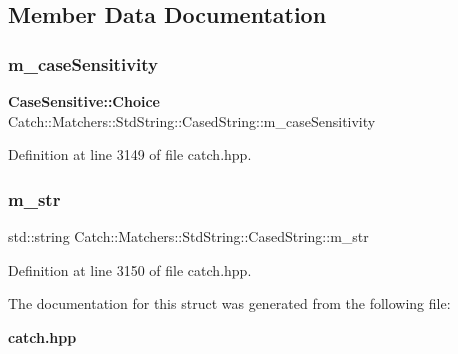 \subsection{Member Data Documentation}
\mbox{\label{struct_catch_1_1_matchers_1_1_std_string_1_1_cased_string_ae1c2864c986941536a6e94cca0528f92}} 
\subsubsection{m\_caseSensitivity}
{\footnotesize\ttfamily \textbf{ Case\+Sensitive\+::\+Choice} Catch\+::\+Matchers\+::\+Std\+String\+::\+Cased\+String\+::m\+\_\+case\+Sensitivity}



Definition at line 3149 of file catch.\+hpp.

\mbox{\label{struct_catch_1_1_matchers_1_1_std_string_1_1_cased_string_ad05dbc99aba3c3c386d6b856b213f911}} 
\subsubsection{m\_str}
{\footnotesize\ttfamily std\+::string Catch\+::\+Matchers\+::\+Std\+String\+::\+Cased\+String\+::m\+\_\+str}



Definition at line 3150 of file catch.\+hpp.



The documentation for this struct was generated from the following file\+:\begin{DoxyCompactItemize}
\item 
\textbf{ catch.\+hpp}\end{DoxyCompactItemize}
